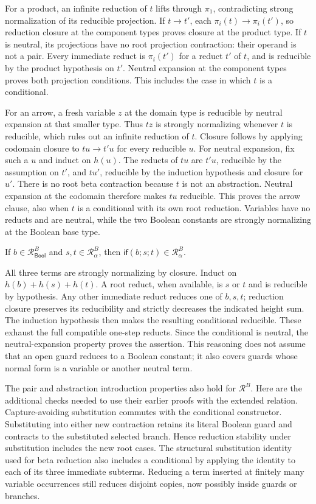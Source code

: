 For a product, an infinite reduction of $t$ lifts through $\pi_1$,
contradicting strong normalization of its reducible projection. If
$t\to t'$, each $\pi_i(t)\to\pi_i(t')$, so reduction closure at the
component types proves closure at the product type. If $t$ is neutral,
its projections have no root projection contraction: their operand
is not a pair. Every immediate reduct is $\pi_i(t')$ for a reduct
$t'$ of $t$, and is reducible by the product hypothesis on $t'$.
Neutral expansion at the component types proves both projection
conditions. This includes the case in which $t$ is a conditional.

For an arrow, a fresh variable $z$ at the domain type is reducible
by neutral expansion at that smaller type. Thus $tz$ is strongly
normalizing whenever $t$ is reducible, which rules out an infinite
reduction of $t$. Closure follows by applying codomain closure to
$tu\to t'u$ for every reducible $u$. For neutral expansion, fix such
a $u$ and induct on $h(u)$. The reducts of $tu$ are $t'u$, reducible
by the assumption on $t'$, and $tu'$, reducible by the induction
hypothesis and closure for $u'$. There is no root beta contraction
because $t$ is not an abstraction. Neutral expansion at the codomain
therefore makes $tu$ reducible. This proves the arrow clause, also
when $t$ is a conditional with its own root reduction. Variables have
no reducts and are neutral, while the two Boolean constants are
strongly normalizing at the Boolean base type.
\Done

\begin{lemma}
If $b\in\mathcal R^B_{\mathsf{Bool}}$ and
$s,t\in\mathcal R^B_\alpha$, then
$\mathsf{if}(b;s;t)\in\mathcal R^B_\alpha$.
\end{lemma}
\Proof
All three terms are strongly normalizing by closure. Induct on
$h(b)+h(s)+h(t)$. A root reduct, when available, is $s$ or $t$ and
is reducible by hypothesis. Any other immediate reduct reduces one
of $b,s,t$; reduction closure preserves its reducibility and strictly
decreases the indicated height sum. The induction hypothesis then
makes the resulting conditional reducible. These exhaust the full
compatible one-step reducts. Since the conditional is neutral, the
neutral-expansion property proves the assertion. This reasoning does
not assume that an open guard reduces to a Boolean constant; it also
covers guards whose normal form is a variable or another neutral term.
\Done

The pair and abstraction introduction properties also hold for
$\mathcal R^B$. Here are the additional checks needed to use their
earlier proofs with the extended relation. Capture-avoiding substitution
commutes with the conditional constructor. Substituting into either
new contraction retains its literal Boolean guard and contracts to
the substituted selected branch. Hence reduction stability under
substitution includes the new root cases. The structural substitution
identity used for beta reduction also includes a conditional by applying
the identity to each of its three immediate subterms. Reducing a term
inserted at finitely many variable occurrences still reduces disjoint
copies, now possibly inside guards or branches.

